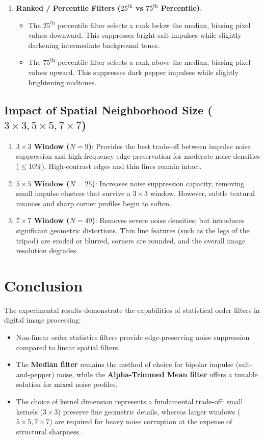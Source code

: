 \documentclass[12pt]{article}
\begin{document}
\begin{enumerate}
    \item \textbf{Ranked / Percentile Filters ($25^{\text{th}}$ vs $75^{\text{th}}$ Percentile)}:
    \begin{itemize}
        \item The $25^{\text{th}}$ percentile filter selects a rank below the median, biasing pixel values downward. This suppresses bright salt impulses while slightly darkening intermediate background tones.
        \item The $75^{\text{th}}$ percentile filter selects a rank above the median, biasing pixel values upward. This suppresses dark pepper impulses while slightly brightening midtones.
    \end{itemize}
\end{enumerate}

\subsection{Impact of Spatial Neighborhood Size ($3 \times 3, 5 \times 5, 7 \times 7$)}
\begin{enumerate}
    \item \textbf{$3 \times 3$ Window ($N = 9$)}:
    Provides the best trade-off between impulse noise suppression and high-frequency edge preservation for moderate noise densities ($\le 10\%$). High-contrast edges and thin lines remain intact.

    \item \textbf{$5 \times 5$ Window ($N = 25$)}:
    Increases noise suppression capacity, removing small impulse clusters that survive a $3 \times 3$ window. However, subtle textural nuances and sharp corner profiles begin to soften.

    \item \textbf{$7 \times 7$ Window ($N = 49$)}:
    Removes severe noise densities, but introduces significant geometric distortions. Thin line features (such as the legs of the tripod) are eroded or blurred, corners are rounded, and the overall image resolution degrades.
\end{enumerate}

\section{Conclusion}
The experimental results demonstrate the capabilities of statistical order filters in digital image processing:
\begin{itemize}
    \item Non-linear order statistics filters provide edge-preserving noise suppression compared to linear spatial filters.
    \item The \textbf{Median filter} remains the method of choice for bipolar impulse (salt-and-pepper) noise, while the \textbf{Alpha-Trimmed Mean filter} offers a tunable solution for mixed noise profiles.
    \item The choice of kernel dimension represents a fundamental trade-off: small kernels ($3 \times 3$) preserve fine geometric details, whereas larger windows ($5 \times 5, 7 \times 7$) are required for heavy noise corruption at the expense of structural sharpness.
\end{itemize}
\end{document}
